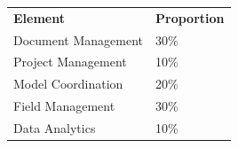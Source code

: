 \begin{table}[h!]
	\begin{center}
	\begin{tabular}{p{5cm}  p{5cm} }
     	\toprule
		\textbf{Element} & \textbf{Proportion} \\ 
    	\cmidrule(r){1-1}\cmidrule(lr){2-2}
      	Document Management & 30\%\\
      	Project Management & 10\%\\
      	Model Coordination & 20\%\\
      	Field Management & 30\%\\
      	Data Analytics & 10\%\\
      	\bottomrule
    \end{tabular}
    \label{tbl:markSchemeAsmt2}
    \end{center}
\end{table}

